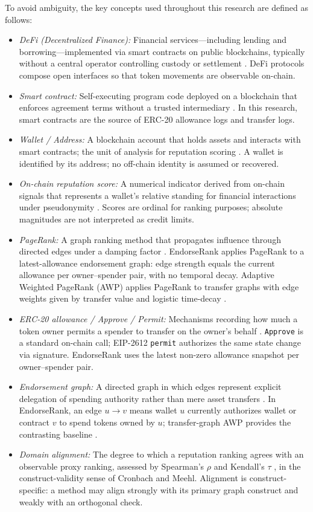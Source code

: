 To avoid ambiguity, the key concepts used throughout this research are defined as follows:

\begin{itemize}
\item \emph{DeFi (Decentralized Finance):} Financial services---including lending and borrowing---implemented via smart contracts on public blockchains, typically without a central operator controlling custody or settlement . DeFi protocols compose open interfaces so that token movements are observable on-chain.
\item \emph{Smart contract:} Self-executing program code deployed on a blockchain that enforces agreement terms without a trusted intermediary . In this research, smart contracts are the source of ERC-20 allowance logs and transfer logs.
\item \emph{Wallet / Address:} A blockchain account that holds assets and interacts with smart contracts; the unit of analysis for reputation scoring . A wallet is identified by its address; no off-chain identity is assumed or recovered.
\item \emph{On-chain reputation score:} A numerical indicator derived from on-chain signals that represents a wallet's relative standing for financial interactions under pseudonymity . Scores are ordinal for ranking purposes; absolute magnitudes are not interpreted as credit limits.
\item \emph{PageRank:} A graph ranking method that propagates influence through directed edges under a damping factor . EndorseRank applies PageRank to a latest-allowance endorsement graph: edge strength equals the current allowance per owner--spender pair, with no temporal decay. Adaptive Weighted PageRank (AWP) applies PageRank to transfer graphs with edge weights given by transfer value and logistic time-decay .
\item \emph{ERC-20 allowance / Approve / Permit:} Mechanisms recording how much a token owner permits a spender to transfer on the owner's behalf . \texttt{Approve} is a standard on-chain call; EIP-2612 \texttt{permit} authorizes the same state change via signature. EndorseRank uses the latest non-zero allowance snapshot per owner--spender pair.
\item \emph{Endorsement graph:} A directed graph in which edges represent explicit delegation of spending authority rather than mere asset transfers . In EndorseRank, an edge $u \to v$ means wallet $u$ currently authorizes wallet or contract $v$ to spend tokens owned by $u$; transfer-graph AWP provides the contrasting baseline .
\item \emph{Domain alignment:} The degree to which a reputation ranking agrees with an observable proxy ranking, assessed by Spearman's $\rho$  and Kendall's $\tau$ , in the construct-validity sense of Cronbach and Meehl. Alignment is construct-specific: a method may align strongly with its primary graph construct and weakly with an orthogonal check.
\end{itemize}

